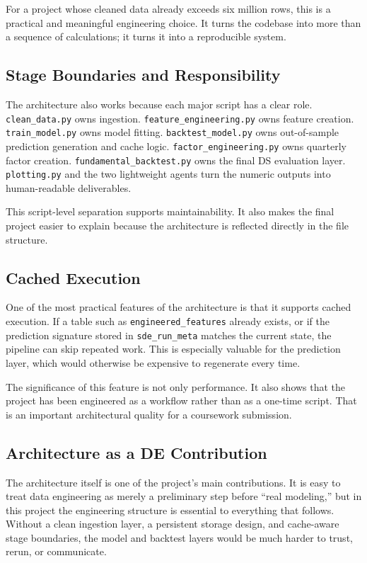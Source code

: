 \documentclass[11pt,a4paper]{article}
\begin{document}
For a project whose cleaned data already exceeds six million rows, this is a
practical and meaningful engineering choice. It turns the codebase into more
than a sequence of calculations; it turns it into a reproducible system.

\subsection{Stage Boundaries and Responsibility}

The architecture also works because each major script has a clear role.
\texttt{clean\_data.py} owns ingestion. \texttt{feature\_engineering.py} owns
feature creation. \texttt{train\_model.py} owns model fitting.
\texttt{backtest\_model.py} owns out-of-sample prediction generation and cache
logic. \texttt{factor\_engineering.py} owns quarterly factor creation.
\texttt{fundamental\_backtest.py} owns the final DS evaluation layer.
\texttt{plotting.py} and the two lightweight agents turn the numeric outputs
into human-readable deliverables.

This script-level separation supports maintainability. It also makes the final
project easier to explain because the architecture is reflected directly in the
file structure.

\subsection{Cached Execution}

One of the most practical features of the architecture is that it supports
cached execution. If a table such as \texttt{engineered\_features} already
exists, or if the prediction signature stored in \texttt{sde\_run\_meta}
matches the current state, the pipeline can skip repeated work. This is
especially valuable for the prediction layer, which would otherwise be
expensive to regenerate every time.

The significance of this feature is not only performance. It also shows that
the project has been engineered as a workflow rather than as a one-time script.
That is an important architectural quality for a coursework submission.

\subsection{Architecture as a DE Contribution}

The architecture itself is one of the project’s main contributions. It is easy
to treat data engineering as merely a preliminary step before “real modeling,”
but in this project the engineering structure is essential to everything that
follows. Without a clean ingestion layer, a persistent storage design, and
cache-aware stage boundaries, the model and backtest layers would be much
harder to trust, rerun, or communicate.
\end{document}

